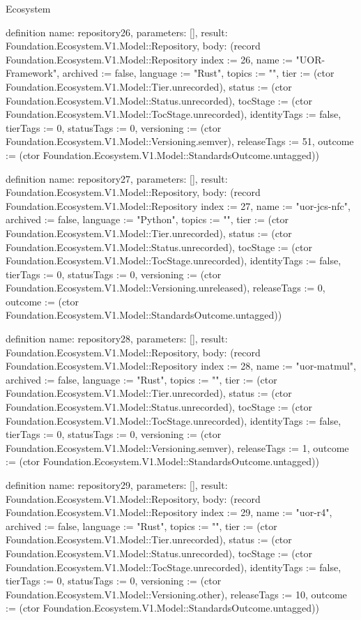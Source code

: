 \begin{lexlean}{Ecosystem}
\begin{semanticmodule}
definition{
  name: repository26,
  parameters: [],
  result: Foundation.Ecosystem.V1.Model::Repository,
  body: (record Foundation.Ecosystem.V1.Model::Repository {index := 26, name := "UOR-Framework", archived := false, language := "Rust", topics := "", tier := (ctor Foundation.Ecosystem.V1.Model::Tier.unrecorded), status := (ctor Foundation.Ecosystem.V1.Model::Status.unrecorded), tocStage := (ctor Foundation.Ecosystem.V1.Model::TocStage.unrecorded), identityTags := false, tierTags := 0, statusTags := 0, versioning := (ctor Foundation.Ecosystem.V1.Model::Versioning.semver), releaseTags := 51, outcome := (ctor Foundation.Ecosystem.V1.Model::StandardsOutcome.untagged)})
}

definition{
  name: repository27,
  parameters: [],
  result: Foundation.Ecosystem.V1.Model::Repository,
  body: (record Foundation.Ecosystem.V1.Model::Repository {index := 27, name := "uor-jcs-nfc", archived := false, language := "Python", topics := "", tier := (ctor Foundation.Ecosystem.V1.Model::Tier.unrecorded), status := (ctor Foundation.Ecosystem.V1.Model::Status.unrecorded), tocStage := (ctor Foundation.Ecosystem.V1.Model::TocStage.unrecorded), identityTags := false, tierTags := 0, statusTags := 0, versioning := (ctor Foundation.Ecosystem.V1.Model::Versioning.unreleased), releaseTags := 0, outcome := (ctor Foundation.Ecosystem.V1.Model::StandardsOutcome.untagged)})
}

definition{
  name: repository28,
  parameters: [],
  result: Foundation.Ecosystem.V1.Model::Repository,
  body: (record Foundation.Ecosystem.V1.Model::Repository {index := 28, name := "uor-matmul", archived := false, language := "Rust", topics := "", tier := (ctor Foundation.Ecosystem.V1.Model::Tier.unrecorded), status := (ctor Foundation.Ecosystem.V1.Model::Status.unrecorded), tocStage := (ctor Foundation.Ecosystem.V1.Model::TocStage.unrecorded), identityTags := false, tierTags := 0, statusTags := 0, versioning := (ctor Foundation.Ecosystem.V1.Model::Versioning.semver), releaseTags := 1, outcome := (ctor Foundation.Ecosystem.V1.Model::StandardsOutcome.untagged)})
}

definition{
  name: repository29,
  parameters: [],
  result: Foundation.Ecosystem.V1.Model::Repository,
  body: (record Foundation.Ecosystem.V1.Model::Repository {index := 29, name := "uor-r4", archived := false, language := "Rust", topics := "", tier := (ctor Foundation.Ecosystem.V1.Model::Tier.unrecorded), status := (ctor Foundation.Ecosystem.V1.Model::Status.unrecorded), tocStage := (ctor Foundation.Ecosystem.V1.Model::TocStage.unrecorded), identityTags := false, tierTags := 0, statusTags := 0, versioning := (ctor Foundation.Ecosystem.V1.Model::Versioning.other), releaseTags := 10, outcome := (ctor Foundation.Ecosystem.V1.Model::StandardsOutcome.untagged)})
}


\end{semanticmodule}
\end{lexlean}
